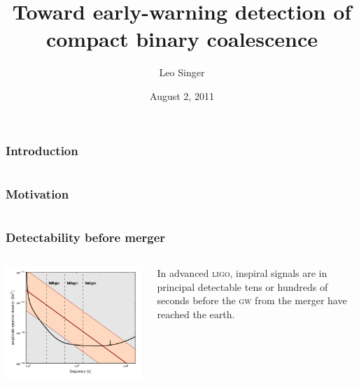 \documentclass{beamer}
\title[LIGO-Gxxxxxxx-vx]{Toward early-warning detection of compact binary coalescence}
\institute[LIGO Caltech]{LIGO Laboratory, California Institute of Technology}
\author[L Singer]{Leo Singer}
\date{August 2, 2011}
\begin{document}
\frame{\titlepage}


\begin{frame}
\frametitle{Introduction}
\end{frame}


\section[Outline]{}
\frame{\tableofcontents}


\section[Motivation]{}


\begin{frame}
\frametitle{Motivation}
\end{frame}


\section[Prospects for early-warning detection]{}


\begin{frame}
	\frametitle{Detectability before merger}
	\begin{columns}
		\begin{column}{0.7\textwidth}
			\includegraphics[width=\textwidth]{figures/snr_psd}
		\end{column}
		\begin{column}{0.3\textwidth}
			In advanced \textsc{ligo}, inspiral signals are in principal detectable {\color{ink3}tens or hundreds of seconds} before the \textsc{gw} from the merger have reached the earth.
		\end{column}
	\end{columns}
\end{frame}
\end{document}
